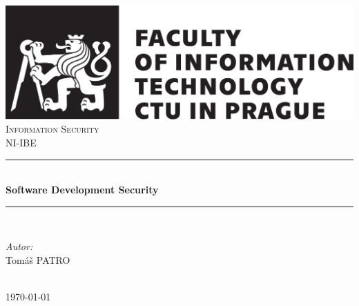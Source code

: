 \documentclass[12pt,a4,twoside]{article}
\begin{document}
\begin{titlepage}

\newcommand{\HRule}{\rule{\linewidth}{0.1mm}}

\center
 

\includegraphics[scale=.75]{graphics/logo-fit-en-cerna.pdf}\\[2cm]
\textsc{\Large Information Security}\\[0.5cm]
\textsc{\large NI-IBE}\\[0.5cm]


\HRule \\[0.4cm]
{ \huge \bfseries Software Development Security}\\[0.4cm]
\HRule \\[1.5cm]
 

\begin{minipage}{0.4\textwidth}
\begin{flushleft} \large
\emph{Autor:}\\
Tomáš \textsc{PATRO}\\
\end{flushleft}

\end{minipage}\\[2cm]


{\large \today}\\[2cm]

\vfill

\end{titlepage}
\end{document}
